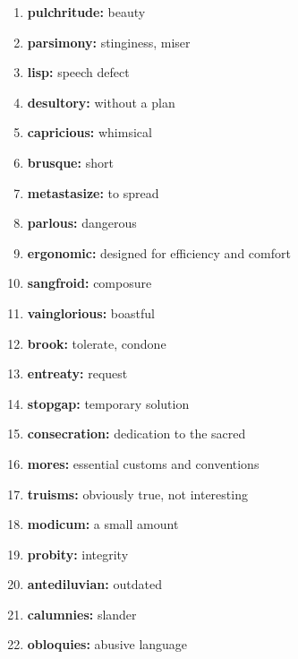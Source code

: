 \documentclass{article}
\begin{document}
\begin{enumerate}
    \item \textbf{pulchritude: }{beauty}
    \item \textbf{parsimony: }{stinginess, miser}
    \item \textbf{lisp: }{speech defect}
    \item \textbf{desultory: }{without a plan}
    \item \textbf{capricious: }{whimsical}
    \item \textbf{brusque: }{short}
    \item \textbf{metastasize: }{to spread}
    \item \textbf{parlous: }{dangerous}
    \item \textbf{ergonomic: }{designed for efficiency and comfort}
    \item \textbf{sangfroid: }{composure}
    \item \textbf{vainglorious: }{boastful}
    \item \textbf{brook: }{tolerate, condone}
    \item \textbf{entreaty: }{request}
    \item \textbf{stopgap: }{temporary solution}
    \item \textbf{consecration: }{dedication to the sacred}
    \item \textbf{mores: }{essential customs and conventions}
    \item \textbf{truisms: }{obviously true, not interesting}
    \item \textbf{modicum: }{a small amount}
    \item \textbf{probity: }{integrity}
    \item \textbf{antediluvian: }{outdated}
    \item \textbf{calumnies: }{slander}
    \item \textbf{obloquies: }{abusive language}
    
\end{enumerate}
\end{document}
